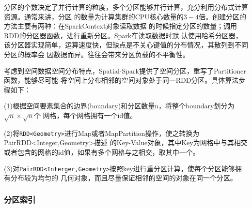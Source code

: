 分区的个数决定了并行计算的粒度，多个分区能够并行计算，充分利用分布式计算资源。通常来讲，分区
的数量为计算集群的CPU核心数量的$3-4$倍。创建分区的方法主要有两种：在SparkContext对象读取数据
的时候指定分区的数量；调用RDD的分区器函数，进行重新分区。Spark在读取数据时默
认使用哈希分区器，该分区器实现简单，运算速度快，但缺点是不关心键值的分布情况，其散列到不同分区的概率会
因数据而异。往往会带来分区负载的不平衡性。

考虑到空间数据空间分布特点，Spatial-Spark提供了空间分区，重写了Partitioner函数，能够尽可能
将空间上分布相邻的空间对象处于同一RDD分区。具体算法步骤如下：

(1)根据空间要素集合的边界(boundary)和分区数量n，将整个boundary划分为$\sqrt{n}\times \sqrt{n}$个
网格，每个网格拥有一个id值。

(2)将\verb|RDD<Geometry>|进行Map或者MapPartition操作，使之转换为PairRDD<Integer,Geometry>描述
的Key-Value对象，其中Key为网格中与其相交或者包含的网格的id值，如果有多个网格与之相交，取其中一个。

(3)对\verb|PairRDD<Interger,Geometry>|按照key进行重分区计算，使每个分区能够拥有分布较为均匀的
几何对象，而且尽量保证相邻的空间的对象在同一个分区。

\subsubsection{分区索引}

